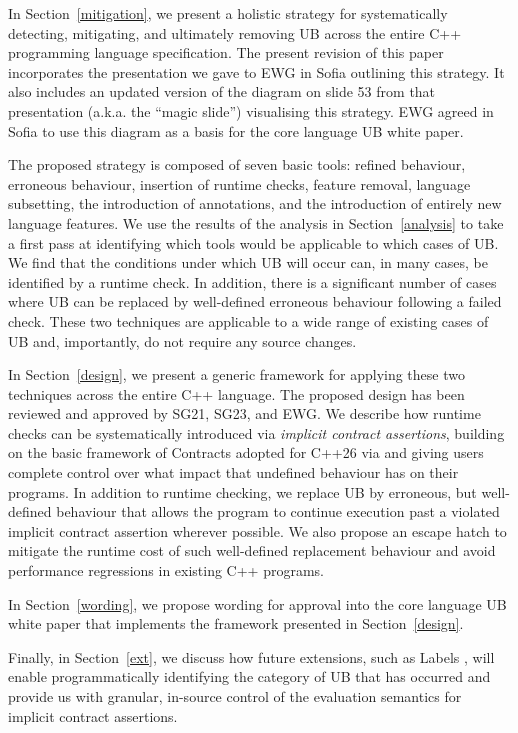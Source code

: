 In Section~\ref{mitigation}, we present a holistic strategy for systematically detecting, mitigating, and ultimately removing UB across the entire C++ programming language specification. The present revision of this paper incorporates the presentation \cite{P3754R0} we gave to EWG in Sofia outlining this strategy. It also includes an updated version of the diagram on slide 53 from that presentation (a.k.a. the ``magic slide'') visualising this strategy. EWG agreed in Sofia to use this diagram as a basis for the core language UB white paper.

The proposed strategy is composed of seven basic tools: refined behaviour, erroneous behaviour, insertion of runtime checks, feature removal, language subsetting, the introduction of annotations, and the introduction of entirely new language features. We use the results of the analysis in Section~\ref{analysis} to take a first pass at identifying which tools would be applicable to which cases of UB. We find that the conditions under which UB will occur can, in many cases, be identified by a runtime check. In addition, there is a significant number of cases where UB can be replaced by well-defined erroneous behaviour following a failed check. These two techniques are applicable to a wide range of existing cases of UB and, importantly, do not require any source changes.

In Section~\ref{design}, we present a generic framework for applying these two techniques across the entire C++ language. The proposed design has been reviewed and approved by SG21, SG23, and EWG. We describe how runtime checks can be systematically introduced via \emph{implicit contract assertions}, building on the basic framework of Contracts adopted for C++26 via \cite{P2900R14} and giving users complete control over what impact that undefined behaviour has on their programs. In addition to runtime checking, we replace UB by erroneous, but well-defined behaviour that allows the program to continue execution past a violated implicit contract assertion wherever possible. We also propose an escape hatch to mitigate the runtime cost of such well-defined replacement behaviour and avoid performance regressions in existing C++ programs.

In Section~\ref{wording}, we propose wording for approval into the core language UB white paper \cite{P3656R1} that implements the framework presented in Section~\ref{design}.

Finally, in Section~\ref{ext}, we discuss how future extensions, such as Labels \cite{P3400R1},
will enable programmatically identifying the category of UB that has occurred and provide us with granular, in-source control of the evaluation semantics for implicit contract assertions.

